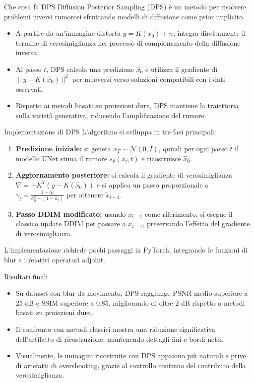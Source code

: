 \begin{frame}{Che cosa fa DPS}
  Diffusion Posterior Sampling (DPS) è un metodo per risolvere problemi inversi rumorosi sfruttando modelli di diffusione come prior implicito.
  \begin{itemize}
    \item A partire da un'immagine distorta $y=K(x_0)+n$, integra direttamente il termine di verosimiglianza nel processo di campionamento della diffusione inversa.
    \item Al passo $t$, DPS calcola una predizione $\hat x_0$ e utilizza il gradiente di $\|y - K(\hat x_0)\|^2$ per muoversi verso soluzioni compatibili con i dati osservati.
    \item Rispetto ai metodi basati su proiezioni dure, DPS mantiene la traiettoria sulla varietà generativa, riducendo l'amplificazione del rumore.
  \end{itemize}
\end{frame}

\begin{frame}[fragile]{Implementazione di DPS}
  L'algoritmo si sviluppa in tre fasi principali:
  \begin{enumerate}
    \item \textbf{Predizione iniziale:} si genera $x_T\sim\mathcal{N}(0,I)$, quindi per ogni passo $t$ il modello UNet stima il rumore $s_\theta(x_t,t)$ e ricostruisce $\hat x_0$.
    \item \textbf{Aggiornamento posteriore:} si calcola il gradiente di verosimiglianza $\nabla = -K^T(y - K(\hat x_0))$ e si applica un passo proporzionale a $\gamma_t=\frac{1-\bar\alpha_t}{\sigma_y^2+(1-\bar\alpha_t)}$ per ottenere $\tilde x_{t-1}$.
    \item \textbf{Passo DDIM modificato:} usando $\tilde x_{t-1}$ come riferimento, si esegue il classico update DDIM per passare a $x_{t-1}$, preservando l'effetto del gradiente di verosimiglianza.
  \end{enumerate}
  \vspace{0.5em}
  L'implementazione richiede pochi passaggi in PyTorch, integrando le funzioni di blur e i relativi operatori adjoint.
\end{frame}

\begin{frame}{Risultati finali}
  \begin{itemize}
    \item Su dataset con blur da movimento, DPS raggiunge PSNR medio superiore a 25 dB e SSIM superiore a 0.85, migliorando di oltre 2 dB rispetto a metodi basati su proiezioni dure.
    \item Il confronto con metodi classici mostra una riduzione significativa dell'artifatto di ricostruzione, mantenendo dettagli fini e bordi netti.
    \item Visualmente, le immagini ricostruite con DPS appaiono più naturali e prive di artefatti di overshooting, grazie al controllo continuo del contributo della verosimiglianza.
  \end{itemize}
\end{frame}